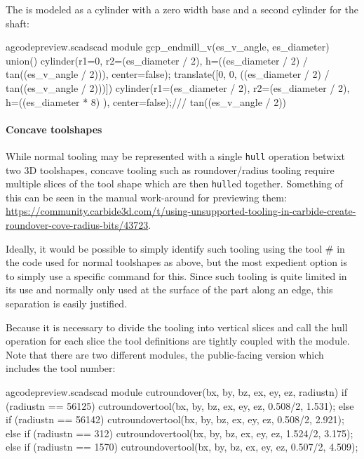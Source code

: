\documentclass{ltxdoc}
\begin{document}
The  is modeled as a cylinder with a zero width base and
a second cylinder for the shaft:
\lstset{firstnumber=\thegcpscad}
\begin{writecode}{a}{gcodepreview.scad}{scad}
module gcp_endmill_v(es_v_angle, es_diameter) {
  union(){
    cylinder(r1=0, r2=(es_diameter / 2), h=((es_diameter / 2) / tan((es_v_angle / 2))), center=false);
    translate([0, 0, ((es_diameter / 2) / tan((es_v_angle / 2)))]){
      cylinder(r1=(es_diameter / 2), r2=(es_diameter / 2), h=((es_diameter * 8) ), center=false);/// tan((es_v_angle / 2))
    }
  }
}

\end{writecode}
\addtocounter{gcpscad}{9}
 
\paragraph{Concave toolshapes}
\label{para:concavetoolshapes} 
While normal tooling may be represented with a single \texttt{hull} operation betwixt two
3D toolshapes, concave tooling such as roundover/radius tooling require multiple slices
of the tool shape which are then \texttt{hull}ed together. Something of this can be seen
in the manual work-around for previewing them: 
\url{https://community.carbide3d.com/t/using-unsupported-tooling-in-carbide-create-roundover-cove-radius-bits/43723}.

Ideally, it would be possible to simply identify such tooling using the tool \# in the
code used for normal toolshapes as above, but the most expedient option is to simply
use a specific command for this. Since such tooling is quite limited in its use and 
normally only used at the surface of the part along an edge, this separation is 
easily justified.

Because it is necessary to divide the tooling into vertical slices and call the hull operation 
for each slice the tool definitions are tightly coupled with the module. Note that there are 
two different modules, the public-facing version which includes the tool number:
 
\lstset{firstnumber=\thegcpscad}
\begin{writecode}{a}{gcodepreview.scad}{scad}
module cutroundover(bx, by, bz, ex, ey, ez, radiustn) {
    if (radiustn == 56125) {
        cutroundovertool(bx, by, bz, ex, ey, ez, 0.508/2, 1.531);
    } else if (radiustn == 56142) {
        cutroundovertool(bx, by, bz, ex, ey, ez, 0.508/2, 2.921);
    } else if (radiustn == 312) {
        cutroundovertool(bx, by, bz, ex, ey, ez, 1.524/2, 3.175);
    } else if (radiustn == 1570) {
        cutroundovertool(bx, by, bz, ex, ey, ez, 0.507/2, 4.509);
    }
}

\end{writecode}
\addtocounter{gcpscad}{12}
\end{document}
